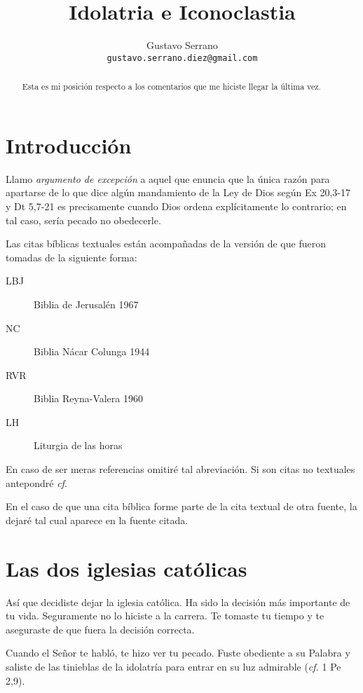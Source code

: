 \documentclass{article}
\title{Idolatria e Iconoclastia}
\author{Gustavo Serrano \\ \tt{gustavo.serrano.diez@gmail.com}}
\begin{document}
\maketitle

\begin{abstract}
\noindent
Esta es mi posici\'on respecto a los comentarios que me hiciste llegar la \'ultima vez.
\end{abstract}

\tableofcontents

\section{Introducci\'on}

Llamo \emph{argumento de excepci\'on} a aquel que enuncia que la \'unica raz\'on para apartarse de lo que dice alg\'un mandamiento de la Ley de Dios seg\'un Ex 20,3-17 y Dt 5,7-21 es precisamente cuando Dios ordena expl\'{i}citamente lo contrario; en tal caso, ser\'{i}a pecado no obedecerle.

Las citas b\'{i}blicas textuales est\'an acompa\~nadas de la versi\'on de que fueron tomadas de la siguiente forma:

\begin{description}
\item[LBJ] Biblia de Jerusal\'en 1967
\item[NC] Biblia N\'acar Colunga 1944
\item[RVR] Biblia Reyna-Valera 1960
\item[LH] Liturgia de las horas
\end{description}

\noindent
En caso de ser meras referencias omitir\'e tal abreviaci\'on. Si son citas no textuales antepondr\'e \emph{cf}.

En el caso de que una cita b\'{i}blica forme parte de la cita textual de otra fuente, la dejar\'e tal cual aparece en la fuente citada.

\section{Las dos iglesias cat\'olicas}

As\'{i} que decidiste dejar la iglesia cat\'olica. Ha sido la decisi\'on m\'as importante de tu vida. Seguramente no lo hiciste a la carrera. Te tomaste tu tiempo y te aseguraste de que fuera la decisi\'on correcta. 

Cuando el Se\~nor te habl\'o, te hizo ver tu pecado. Fuste obediente a su Palabra y saliste de las tinieblas de la idolatr\'{i}a para entrar en su luz admirable (\emph{cf.} 1 Pe 2,9).
\end{document}
